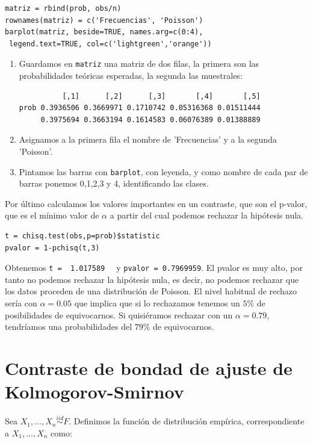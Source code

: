 \documentclass[nochap]{apuntes}
\begin{document}
\begin{example}
\begin{verbatim}
matriz = rbind(prob, obs/n)
rownames(matriz) = c('Frecuencias', 'Poisson')
barplot(matriz, beside=TRUE, names.arg=c(0:4),
 legend.text=TRUE, col=c('lightgreen','orange'))
\end{verbatim}

\begin{enumerate}
\item Guardamos en \verb|matriz| una matriz de dos filas, la primera son las probabilidades teóricas esperadas, la segunda las muestrales:
\begin{verbatim}
          [,1]      [,2]      [,3]       [,4]       [,5]
prob 0.3936506 0.3669971 0.1710742 0.05316368 0.01511444
     0.3975694 0.3663194 0.1614583 0.06076389 0.01388889
\end{verbatim}
\item Asignamos a la primera fila el nombre de 'Frecuencias' y a la segunda 'Poisson'.
\item Pintamos las barras con \verb|barplot|, con leyenda, y como nombre de cada par de barras ponemos 0,1,2,3 y 4, identificando las clases.
\end{enumerate}

Por último calculamos los valores importantes en un contraste, que son el p-valor, que es el mínimo valor de $\alpha$ a partir del cual podemos rechazar la hipótesis nula.

\begin{verbatim}
t = chisq.test(obs,p=prob)$statistic
pvalor = 1-pchisq(t,3)
\end{verbatim}

Obtenemos \verb|t =  1.017589  | y \verb|pvalor = 0.7969959|. El pvalor es muy alto, por tanto no podemos rechazar la hipótesis nula, es decir, no podemos rechazar que los datos proceden de una distribución de Poisson.  El nivel habitual de rechazo sería con $\alpha = 0.05$ que implica que si lo rechazamos tenemos un $5\%$ de posibilidades de equivocarnos. Si quisiéramos rechazar con un $\alpha = 0.79$, tendríamos una probabilidades del $79\%$ de equivocarnos.



\end{example}



\section{Contraste de bondad de ajuste de Kolmogorov-Smirnov}
Sea $X_1,...,X_n \stackrel{iid}{\sim} F$. Definimos la función de distribución empírica, correspondiente a $X_1,...,X_n$ como:
\end{document}
